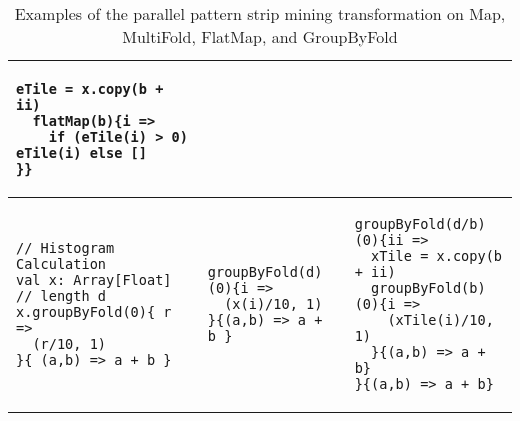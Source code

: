 \begin{table*}[t]
\begin{tabular}{@{}lll@{}}
{\begin{lstlisting}[numbers=none]
  eTile = x.copy(b + ii)
  flatMap(b){i =>
    if (eTile(i) > 0) eTile(i) else []
}}
\end{lstlisting}} \\ \midrule
{\begin{lstlisting}[numbers=none]
// Histogram Calculation
val x: Array[Float] // length d
x.groupByFold(0){ r =>
  (r/10, 1)
}{ (a,b) => a + b }
\end{lstlisting}}
&
{\begin{lstlisting}[numbers=none]
groupByFold(d)(0){i =>
  (x(i)/10, 1)
}{(a,b) => a + b }
\end{lstlisting}}
&
{\begin{lstlisting}[numbers=none]
groupByFold(d/b)(0){ii =>
  xTile = x.copy(b + ii)
  groupByFold(b)(0){i =>
    (xTile(i)/10, 1)
  }{(a,b) => a + b}
}{(a,b) => a + b}
\end{lstlisting}} \\ \bottomrule
\end{tabular}
\caption{Examples of the parallel pattern strip mining transformation on Map, MultiFold, FlatMap, and GroupByFold}
\label{table:stripmine-examples}
\end{table*}